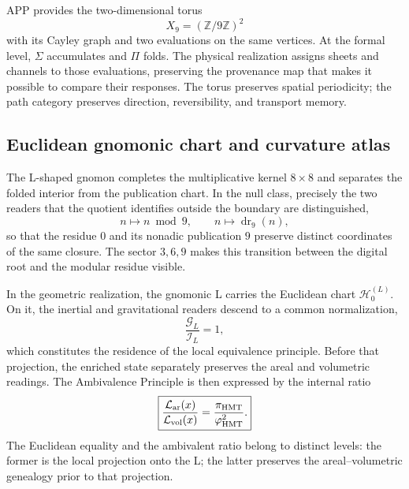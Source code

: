 APP provides the two-dimensional torus
\[
 X_9=(\mathbb Z/9\mathbb Z)^2
\]
with its Cayley graph and two evaluations on the same vertices. At the formal level, \(\Sigma\) accumulates and \(\Pi\) folds. The physical realization assigns sheets and channels to those evaluations, preserving the provenance map that makes it possible to compare their responses. The torus preserves spatial periodicity; the path category preserves direction, reversibility, and transport memory.

\subsection{Euclidean gnomonic chart and curvature atlas}
\label{sec:carta-gnomonica-equivalencia-ads-ds}

The L-shaped gnomon completes the multiplicative kernel \(8\times8\) and separates the
folded interior from the publication chart. In
the null class, precisely the two readers that the quotient identifies
outside the boundary are distinguished,
\[
 n\longmapsto n\bmod 9,
 \qquad
 n\longmapsto\operatorname{dr}_9(n),
\]
so that the residue \(0\) and its nonadic publication \(9\) preserve
distinct coordinates of the same closure. The sector \(3,6,9\) makes
this transition between the digital root and the modular residue visible.

In the geometric realization, the gnomonic L carries the Euclidean chart
\(\mathscr H_0^{(L)}\). On it, the inertial and gravitational readers
descend to a common normalization,
\[
 \frac{\mathcal G_{L}}{\mathcal I_{L}}=1,
\]
which constitutes the residence of the local equivalence principle. Before
that projection, the enriched state separately preserves the areal
and volumetric readings. The Ambivalence Principle is then expressed by
the internal ratio
\[
 \boxed{
 \frac{\mathcal L_{\rm ar}(x)}{\mathcal L_{\rm vol}(x)}
 =\frac{\pi_{\rm HMT}}{\varphi_{\rm HMT}^{2}}.}
\]
The Euclidean equality and the ambivalent ratio belong to distinct levels:
the former is the local projection onto the L; the latter preserves the
areal--volumetric genealogy prior to that projection.

